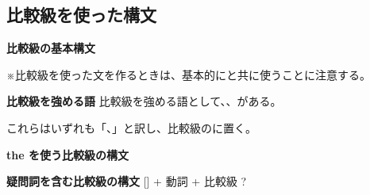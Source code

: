 \subsection{比較級を使った構文}\vspace{-0.35em}
    \begin{theorembox}{\textbf{比較級の基本構文}}
    \end{theorembox}
    \vspace{0.25em}

    ※比較級を使った文を作るときは、基本的にと共に使うことに注意する。

    \begin{techniquebox}{\textbf{比較級を強める語}}
        比較級を強める語として、、がある。

        これらはいずれも「、」と訳し、比較級のに置く。
    \end{techniquebox}
    \vspace{0.25em}

    \begin{theorembox}{\textbf{the を使う比較級の構文}}
    \end{theorembox}
    \vspace{0.25em}

    \begin{theorembox}{\textbf{疑問詞を含む比較級の構文}}
         [] + 動詞 + 比較級\fitblankcomma{} ?
    \end{theorembox}

